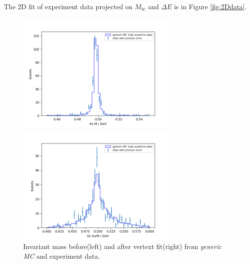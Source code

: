 The 2D fit of experiment data projected on $M_{bc}$ and $\Delta E$ is in Figure \ref{fig:2Ddata}.  
\begin{figure}[htbp]
\begin{minipage}[b]{0.5\linewidth}
	\centering 
	\includegraphics[height=6cm]{figures/best_KsM}	
\end{minipage}
\begin{minipage}[b]{0.5\linewidth}
	\centering 
	\includegraphics[height=6cm]{figures/best_KsInvM}	
\end{minipage}
\caption{Invariant mass before(left) and after vertext fit(right) from \textit{generic MC} and experiment data.}
\label{fig:b0ksmass}
\end{figure}

